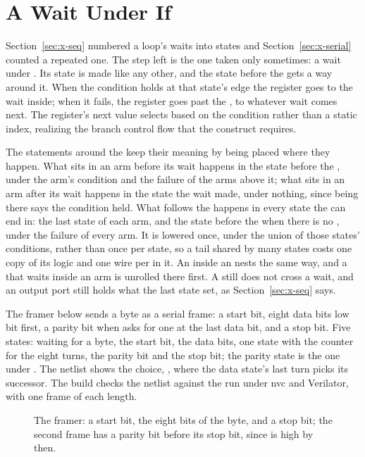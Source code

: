\section{A Wait Under If}
\label{sec:x-frame}

Section~\ref{sec:x-seq} numbered a loop's waits into states and
Section~\ref{sec:x-serial} counted a repeated one. The step left is
the one taken only sometimes: a wait under . Its state is
made like any other, and the state before the  gets a way
around it. When the condition holds at that state's edge the
register goes to the wait inside; when it fails, the register goes
past the , to whatever wait comes next. The register's
next value selects based on the condition rather than a static index,
realizing the branch control flow that the  construct requires.

The statements around the  keep their meaning by being
placed where they happen. What sits in an arm before its wait
happens in the state before the , under the arm's
condition and the failure of the arms above it; what sits in an arm
after its wait happens in the state the wait made, under nothing,
since being there says the condition held. What follows the
 happens in every state the  can end in: the last
state of each arm, and the state before the  when there is
no , under the failure of every arm. It is lowered once,
under the union of those states' conditions, rather than once per
state, so a tail shared by many states costs one copy of its logic
and one wire per  in it. An  inside
an  nests the same way, and a  that waits inside
an arm is unrolled there first. A  still does not cross a
wait, and an output port still holds what the last state set, as
Section~\ref{sec:x-seq} says.

The framer below sends a byte as a serial frame: a start bit, eight
data bits low bit first, a parity bit when  asks for
one at the last data bit, and a stop bit. Five states: waiting for a
byte, the start bit, the data bits, one state with the counter
 for the eight turns, the parity bit and the stop bit; the
parity state is the one under . The netlist shows the
choice, , where the data state's last
turn picks its successor. The build checks the netlist against the
run under nvc and Verilator, with one frame of each length.

\begin{figure}[htbp]
\centering

\caption{The framer: a start bit, the eight bits of the byte, and a
stop bit; the second frame has a parity bit before its stop bit,
since  is high by then.}
\label{fig:x-frame}
\end{figure}




